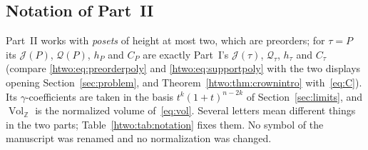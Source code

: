 \documentclass[11pt]{article}
\numberwithin{equation}{section}
\theoremstyle{definition}
\newcommand{\Z}{\mathbb Z}
\newcommand{\J}{\mathcal J(\tau)}
\newcommand{\Qt}{\mathcal Q_\tau}
\newcommand{\Vol}{\operatorname{Vol}_{\Z}}
\newcommand{\Qp}{\mathcal Q(P)}
\begin{document}
\subsection{Notation of Part~II}
\label{htwo:sec:notation}
Part~II works with \emph{posets} of height at most two, which are preorders;
for $\tau=P$ its $\mathcal J(P)$, $\Qp$, $h_P$ and $C_P$ are exactly Part~I's
$\J$, $\Qt$, $h_\tau$ and $C_\tau$ (compare \eqref{htwo:eq:preorderpoly} and
\eqref{htwo:eq:supportpoly} with the two displays opening
Section~\ref{sec:problem}, and
Theorem~\ref{htwo:thm:crownintro} with~\eqref{eq:C}). Its $\gamma$-coefficients
are taken in the basis $t^k(1+t)^{n-2k}$ of Section~\ref{sec:limits}, and
$\Vol$ is the normalized volume of~\eqref{eq:vol}. Several letters mean
different things in the two parts; Table~\ref{htwo:tab:notation} fixes them.
No symbol of the manuscript was renamed and no normalization was changed.
\end{document}
